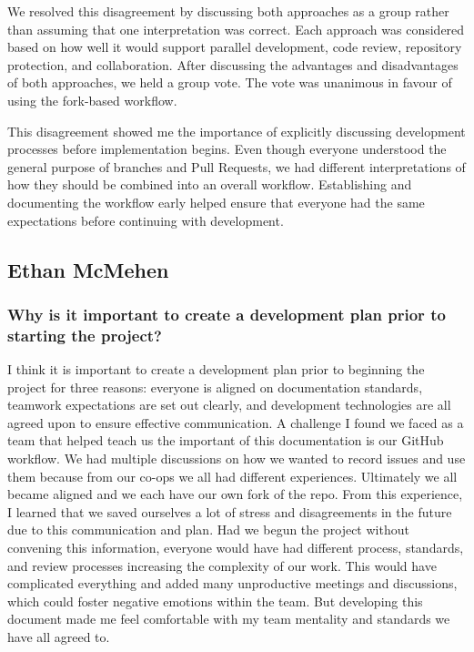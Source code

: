 \documentclass{article}
\begin{document}
We resolved this disagreement by discussing both approaches as a group rather than assuming that one interpretation was correct. Each approach was considered based on how well it would support parallel development, code review, repository protection, and collaboration. After discussing the advantages and disadvantages of both approaches, we held a group vote. The vote was unanimous in favour of using the fork-based workflow.

This disagreement showed me the importance of explicitly discussing development processes before implementation begins. Even though everyone understood the general purpose of branches and Pull Requests, we had different interpretations of how they should be combined into an overall workflow. Establishing and documenting the workflow early helped ensure that everyone had the same expectations before continuing with development.

\subsection*{Ethan McMehen}

\subsubsection*{Why is it important to create a development plan prior to starting the project?}

I think it is important to create a development plan prior to beginning the 
project for three reasons: everyone is aligned on documentation standards, teamwork 
expectations are set out clearly, and development technologies are all agreed upon 
to ensure effective communication. A challenge I found we faced as a team that 
helped teach us the important of this documentation is our GitHub workflow. We 
had multiple discussions on how we wanted to record issues and use them because 
from our co-ops we all had different experiences. Ultimately we all became aligned 
and we each have our own fork of the repo. From this experience, I learned that 
we saved ourselves a lot of stress and disagreements in the future due to this 
communication and plan. Had we begun the project without convening this information, 
everyone would have had different process, standards, and review processes increasing 
the complexity of our work. This would have complicated everything and added many 
unproductive meetings and discussions, which could foster negative emotions within 
the team. But developing this document made me feel comfortable with my team mentality 
and standards we have all agreed to.
\end{document}
